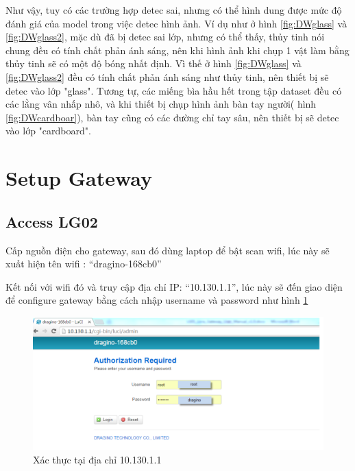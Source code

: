 Như vậy, tuy có các trường hợp detec sai, nhưng có thể hình dung được mức độ đánh giá của model trong việc detec hình ảnh. Ví dụ như ở hình \ref{fig:DWglass} và \ref{fig:DWglass2}, mặc dù đã bị detec sai lớp, nhưng có thể thấy, thủy tinh nói chung đều có tính chất phản ánh sáng, nên khi hình ảnh khi chụp 1 vật làm bằng thủy tinh sẽ có một độ bóng nhất định. Vì thế ở hình \ref{fig:DWglass} và \ref{fig:DWglass2} đều có tính chất phản ánh sáng như thủy tinh, nên thiết bị sẽ detec vào lớp "glass". Tương tự, các miếng bìa hầu hết trong tập dataset đều có các lằng vân nhấp nhô, và khi thiết bị chụp hình ảnh bàn tay người( hình \ref{fig:DWcardboar}), bàn tay cũng có các đường chỉ tay sâu, nên thiết bị sẽ detec vào lớp "cardboard".


\section{Setup Gateway}
\subsection{Access LG02}
Cấp nguồn điện cho gateway, sau đó dùng laptop để bật scan wifi, lúc này sẽ xuất hiện tên wifi : “dragino-168cb0”

Kết nối với wifi đó và truy cập địa chỉ IP: “10.130.1.1”, lúc này sẽ đến giao diện để configure gateway bằng cách nhập username và password như hình \ref{fig:gateway_configure}
\begin{figure}[H]
    \includegraphics[width=\textwidth]{images/Quanh/Gateway_configure.png}
    \caption{Xác thực tại địa chỉ 10.130.1.1}
    \label{fig:gateway_configure}
\end{figure}

